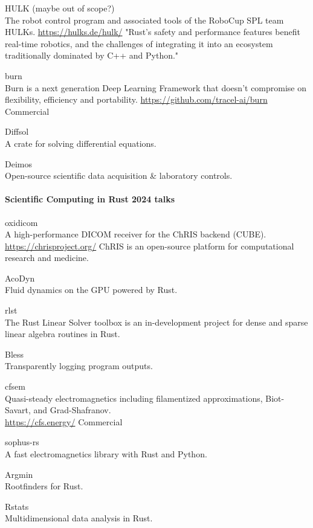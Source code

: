 \documentclass{article}
\begin{document}
HULK (maybe out of scope?)\\
The robot control program and associated tools of the RoboCup SPL team
HULKs. \url{https://hulks.de/hulk/} "Rust’s safety and performance features benefit real-time
robotics, and the challenges of integrating it into an ecosystem traditionally dominated by C++ and
Python."

burn\\
Burn is a next generation Deep Learning Framework that doesn't compromise on flexibility,
efficiency and portability. \url{https://github.com/tracel-ai/burn}\\
Commercial

Diffsol\\
A crate for solving differential equations.

Deimos\\
Open-source scientific data acquisition \& laboratory controls.

\paragraph{Scientific Computing in Rust 2024 talks}

oxidicom\\
A high-performance DICOM receiver for the ChRIS backend (CUBE).
\url{https://chrisproject.org/} ChRIS is an open-source platform for computational research and
medicine.

AcoDyn\\
Fluid dynamics on the GPU powered by Rust.

rlst\\
The Rust Linear Solver toolbox is an in-development project for dense and sparse linear
algebra routines in Rust.

Bless\\
Transparently logging program outputs.

cfsem\\
Quasi-steady electromagnetics including filamentized approximations, Biot-Savart, and
Grad-Shafranov.\\
\url{https://cfs.energy/} Commercial

sophus-rs\\
A fast electromagnetics library with Rust and Python.

Argmin\\
Rootfinders for Rust.

Rstats\\
Multidimensional data analysis in Rust.
\end{document}
